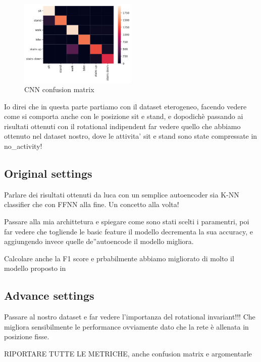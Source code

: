 \begin{figure}[h]
  \centering
  \includegraphics[width=0.5\textwidth]{images/confusion_matrix.png}
  \caption{CNN confusion matrix}
  \label{fig:cnn-confusion-matrix}
\end{figure}

Io direi che in questa parte partiamo con il dataset eterogeneo, facendo vedere come si comporta anche con le posizione sit e stand, e dopodichè passando ai risultati ottenuti con il rotational indipendent far vedere quello che abbiamo ottenuto nel dataset nostro, dove le attivita' sit e stand sono state compressate in no\_activity!

\subsection{Original settings}

Parlare dei risultati ottenuti da luca con un semplice autoencoder sia K-NN classifier che con FFNN alla fine. Un concetto alla volta!

Passare alla mia archittetura e spiegare come sono stati scelti i paramentri, poi far vedere che togliende le basic feature il modello decrementa la sua accuracy, e aggiungendo invece quelle de''autoencode il modello migliora. 

Calcolare anche la F1 score e prbabilmente abbiamo migliorato di molto il modello proposto in \cite{blunck2013heterogeneity}

\subsection{Advance settings}
Passare al nostro dataset e far vedere l'importanza del rotational invariant!!! Che migliora sensibilmente le performance ovviamente dato che la rete è allenata in posizione fisse.

RIPORTARE TUTTE LE METRICHE, anche confusion matrix e argomentarle
